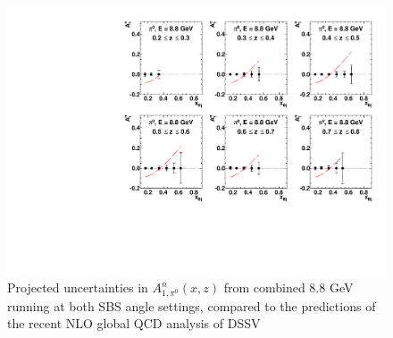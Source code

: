 \begin{figure}[h]
  \begin{center}
    \includegraphics[width=.75\textwidth]{figures/A1n_vs_x_E88_pi0.pdf}
  \end{center}
  \caption{\label{A1n_pi0_88gev} Projected uncertainties in $A_{1,\pi^0}^{n}(x,z)$ from combined 8.8 GeV running at both SBS angle settings, compared to the predictions of the recent NLO global QCD analysis of DSSV~\cite{DSSVplus}}
\end{figure}
